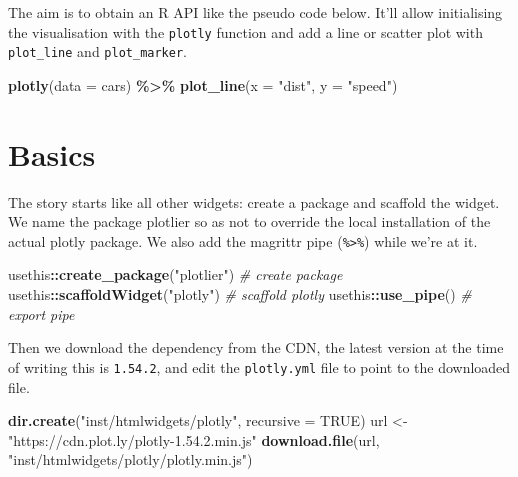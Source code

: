 \documentclass[
]{krantz}
\makeatletter
\newenvironment{Shaded}{\begin{snugshade}}{\end{snugshade}}
\newcommand{\CommentTok}[1]{\textcolor[rgb]{0.37,0.37,0.37}{\textit{#1}}}
\newcommand{\DataTypeTok}[1]{\textcolor[rgb]{0.27,0.27,0.27}{#1}}
\newcommand{\KeywordTok}[1]{\textcolor[rgb]{0.27,0.27,0.27}{\textbf{#1}}}
\newcommand{\NormalTok}[1]{#1}
\newcommand{\OperatorTok}[1]{\textcolor[rgb]{0.43,0.43,0.43}{\textbf{#1}}}
\newcommand{\OtherTok}[1]{\textcolor[rgb]{0.37,0.37,0.37}{#1}}
\newcommand{\StringTok}[1]{\textcolor[rgb]{0.5,0.5,0.5}{#1}}
\newenvironment{kframe}{%
\medskip{}
\setlength{\fboxsep}{.8em}
 \def\at@end@of@kframe{}%
 \ifinner\ifhmode%
  \def\at@end@of@kframe{\end{minipage}}%
  \begin{minipage}{\columnwidth}%
 \fi\fi%
 \def\FrameCommand##1{\hskip\@totalleftmargin \hskip-\fboxsep
 \colorbox{shadecolor}{##1}\hskip-\fboxsep
     \hskip-\linewidth \hskip-\@totalleftmargin \hskip\columnwidth}%
 \MakeFramed {\advance\hsize-\width
   \@totalleftmargin\z@ \linewidth\hsize
   \@setminipage}}%
 {\par\unskip\endMakeFramed%
 \at@end@of@kframe}
\renewenvironment{Shaded}{\begin{kframe}}{\end{kframe}}
\makeatother
\begin{document}
The aim is to obtain an R API like the pseudo code below. It'll allow initialising the visualisation with the \texttt{plotly} function and add a line or scatter plot with \texttt{plot\_line} and \texttt{plot\_marker}.

\begin{Shaded}
\begin{Highlighting}[]
\KeywordTok{plotly}\NormalTok{(}\DataTypeTok{data =}\NormalTok{ cars) }\OperatorTok{\%>\%}\StringTok{ }
\StringTok{  }\KeywordTok{plot\_line}\NormalTok{(}\DataTypeTok{x =} \StringTok{"dist"}\NormalTok{, }\DataTypeTok{y =} \StringTok{"speed"}\NormalTok{)}
\end{Highlighting}
\end{Shaded}

\hypertarget{basics}{%
\section{Basics}\label{basics}}

The story starts like all other widgets: create a package and scaffold the widget. We name the package plotlier so as not to override the local installation of the actual plotly package. We also add the magrittr pipe (\texttt{\%\textgreater{}\%}) while we're at it.

\begin{Shaded}
\begin{Highlighting}[]
\NormalTok{usethis}\OperatorTok{::}\KeywordTok{create\_package}\NormalTok{(}\StringTok{"plotlier"}\NormalTok{) }\CommentTok{\# create package}
\NormalTok{usethis}\OperatorTok{::}\KeywordTok{scaffoldWidget}\NormalTok{(}\StringTok{"plotly"}\NormalTok{) }\CommentTok{\# scaffold plotly}
\NormalTok{usethis}\OperatorTok{::}\KeywordTok{use\_pipe}\NormalTok{() }\CommentTok{\# export pipe}
\end{Highlighting}
\end{Shaded}

Then we download the dependency from the CDN, the latest version at the time of writing this is \texttt{1.54.2}, and edit the \texttt{plotly.yml} file to point to the downloaded file.

\begin{Shaded}
\begin{Highlighting}[]
\KeywordTok{dir.create}\NormalTok{(}\StringTok{"inst/htmlwidgets/plotly"}\NormalTok{, }\DataTypeTok{recursive =} \OtherTok{TRUE}\NormalTok{)}
\NormalTok{url <{-}}\StringTok{ "https://cdn.plot.ly/plotly{-}1.54.2.min.js"}
\KeywordTok{download.file}\NormalTok{(url, }\StringTok{"inst/htmlwidgets/plotly/plotly.min.js"}\NormalTok{)}
\end{Highlighting}
\end{Shaded}
\end{document}
